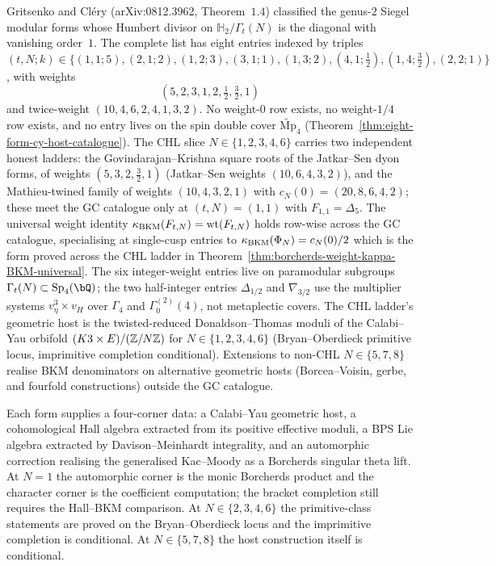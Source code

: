 Gritsenko and Cl\'ery (arXiv:0812.3962, Theorem~$1.4$) classified the
genus-$2$ Siegel modular forms whose Humbert divisor on
$\mathbb{H}_2/\Gamma_t(N)$ is the diagonal with vanishing
order~$1$. The complete list has eight entries indexed by triples
$(t, N; k) \in \{(1,1;5),(2,1;2),(1,2;3),(3,1;1),(1,3;2),(4,1;\tfrac12),
(1,4;\tfrac32),(2,2;1)\}$, with weights
\[
(5, 2, 3, 1, 2, \tfrac12, \tfrac32, 1)
\]
and twice-weight $(10, 4, 6, 2, 4, 1, 3, 2)$. No weight-$0$ row exists,
no weight-$1/4$ row exists, and no entry lives on the spin double
cover $\widetilde{\mathrm{Mp}}_4$
(Theorem~\ref{thm:eight-form-cy-host-catalogue}). The CHL slice
$N \in \{1, 2, 3, 4, 6\}$ carries two independent honest ladders:
the Govindarajan--Krishna square roots of the Jatkar--Sen dyon forms,
of weights $(5, 3, 2, \tfrac32, 1)$ (Jatkar--Sen weights
$(10, 6, 4, 3, 2)$), and the Mathieu-twined family of weights
$(10, 4, 3, 2, 1)$ with $c_N(0) = (20, 8, 6, 4, 2)$; these meet the
GC catalogue only at $(t, N) = (1, 1)$ with $F_{1, 1} = \Delta_5$. The
universal weight identity $\kappa_{\mathrm{BKM}}(F_{t, N}) = \mathrm{wt}(F_{t, N})$
holds row-wise across the GC catalogue, specialising at single-cusp
entries to $\kappa_{\mathrm{BKM}}(\Phi_N) = c_N(0)/2$ which is the form proved across the CHL
ladder in Theorem~\ref{thm:borcherds-weight-kappa-BKM-universal}. The
six integer-weight entries live on paramodular subgroups
$\Gamma_t(N) \subset \mathrm{Sp}_4(\bQ)$; the two half-integer entries
$\Delta_{1/2}$ and $\nabla_{3/2}$ use the multiplier systems
$v_\eta^3 \times v_H$ over $\Gamma_4$ and $\Gamma_0^{(2)}(4)$, not
metaplectic covers. The CHL ladder's geometric host is the
twisted-reduced Donaldson--Thomas moduli of the Calabi--Yau orbifold
$(K3 \times E)/(\mathbb{Z}/N\mathbb{Z})$ for $N \in \{1, 2, 3, 4, 6\}$
(Bryan--Oberdieck primitive locus, imprimitive completion
conditional). Extensions to non-CHL $N \in \{5, 7, 8\}$ realise BKM
denominators on alternative geometric hosts
(Borcea--Voisin, gerbe, and fourfold constructions) outside the GC
catalogue.

Each form supplies a four-corner data: a Calabi--Yau geometric host,
a cohomological Hall algebra extracted from its positive effective
moduli, a BPS Lie algebra extracted by Davison--Meinhardt
integrality, and an automorphic correction realising the
generalised Kac--Moody as a Borcherds singular theta lift. At
$N=1$ the automorphic corner is the monic Borcherds product and the
character corner is the coefficient computation; the bracket completion
still requires the Hall--BKM comparison. At $N\in\{2,3,4,6\}$ the
primitive-class statements are proved on the Bryan--Oberdieck locus and
the imprimitive completion is
conditional. At $N\in\{5,7,8\}$ the host construction itself is
conditional.

